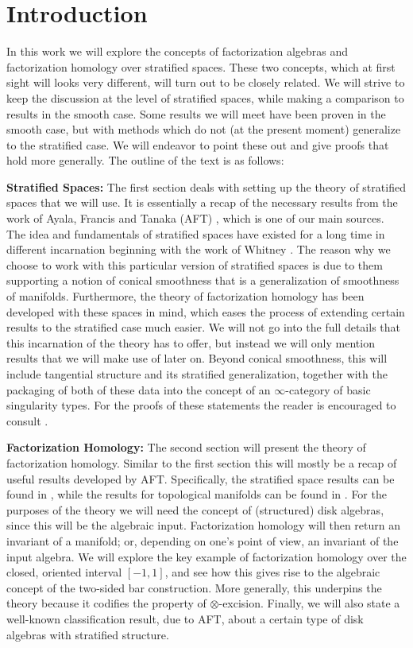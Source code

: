 \documentclass[../text]{subfiles}
\begin{document}
\section{Introduction}

In this work we will explore the concepts of factorization algebras and factorization homology over stratified spaces. These two concepts, which at first sight will looks very different, will turn out to be closely related. We will strive to keep the discussion at the level of stratified spaces, while making a comparison to results in the smooth case. Some results we will meet have been proven in the smooth case, but with methods which do not (at the present moment) generalize to the stratified case. We will endeavor to point these out and give proofs that hold more generally. The outline of the text is as follows:

\textbf{ Stratified Spaces:} The first section deals with setting up the theory of stratified spaces that we will use. It is essentially a recap of the necessary results from the work of Ayala, Francis and Tanaka (AFT) \cite{aft_localstrut}, which is one of our main sources. The idea and fundamentals of stratified spaces have existed for a long time in different incarnation beginning with the work of Whitney \cite{whitney92}. The reason why we choose to work with this particular version of stratified spaces is due to them supporting a notion of conical smoothness that is a generalization of smoothness of manifolds. Furthermore, the theory of factorization homology has been developed with these spaces in mind, which eases the process of extending certain results to the stratified case much easier. We will not go into the full details that this incarnation of the theory has to offer, but instead we will only mention results that we will make use of later on. Beyond conical smoothness, this will include tangential structure and its stratified generalization, together with the packaging of both of these data into the concept of an $\infty$-category of basic singularity types. For the proofs of these statements the reader is encouraged to consult \cite{aft_localstrut}.

\textbf{ Factorization Homology:} The second section will present the theory of factorization homology. Similar to the first section this will mostly be a recap of useful results developed by AFT. Specifically, the stratified space results can be found in \cite{aft_fhstrat}, while the results for topological manifolds can be found in \cite{af_fhtop}. For the purposes of the theory we will need the concept of (structured) disk algebras, since this will be the algebraic input. Factorization homology will then return an invariant of a manifold; or, depending on one's point of view, an invariant of the input algebra. We will explore the key example of factorization homology over the closed, oriented interval $[-1,1]$, and see how this gives rise to the algebraic concept of the two-sided bar construction. More generally, this underpins the theory because it codifies the property of $\otimes$-excision. Finally, we will also state a well-known classification result, due to AFT, about a certain type of disk algebras with stratified structure.
\end{document}
